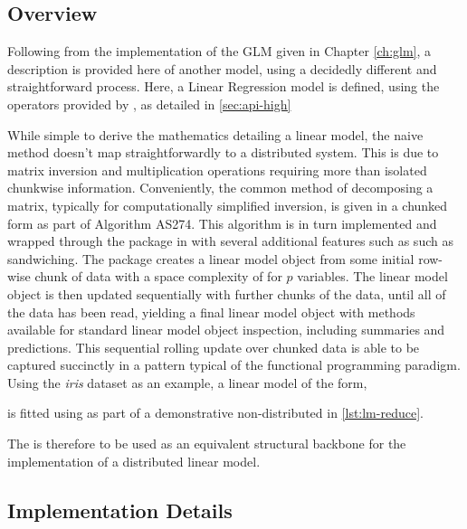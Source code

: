 \subsection{Overview}

Following from the implementation of the GLM given in Chapter \cref{ch:glm}, a description is provided here of another model, using a decidedly different and straightforward process.
Here, a Linear Regression model is defined, using the operators provided by \lso{}, as detailed in \cref{sec:api-high}

While simple to derive the mathematics detailing a linear model, the naive method doesn't map straightforwardly to a distributed system.
This is due to matrix inversion and multiplication operations requiring more than isolated chunkwise information.
Conveniently, the common method of decomposing a matrix, typically for computationally simplified inversion, is given in a chunked form as part of Algorithm AS274\cite{miller1992as274}.
This algorithm is in turn implemented and wrapped through the  package in \R{} with several additional features such as such as sandwiching\cite{lumley2013biglm}.
The  package creates a linear model object from some initial row-wise chunk of data with a space complexity of  for $p$ variables.
The linear model object is then updated sequentially with further chunks of the data, until all of the data has been read, yielding a final linear model object with methods available for standard linear model object inspection, including summaries and predictions.
This sequential rolling update over chunked data is able to be captured succinctly in a  pattern typical of the functional programming paradigm.
Using the \textit{iris} dataset as an example, a linear model of the form, 


is fitted using  as part of a demonstrative non-distributed  in \cref{lst:lm-reduce}.


The  is therefore to be used as an equivalent structural backbone for the implementation of a distributed linear model.

\subsection{Implementation Details}

